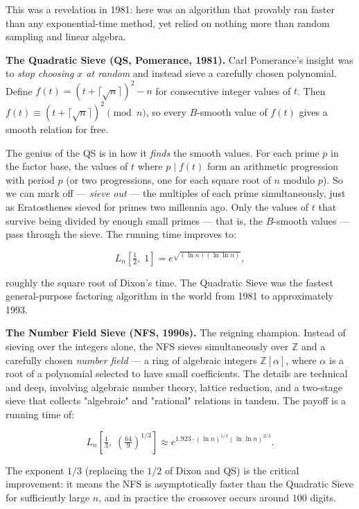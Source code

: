 \documentclass[11pt,twoside,openright]{book}
\theoremstyle{definition}
\theoremstyle{remark}
\begin{document}
This was a revelation in 1981: here was an algorithm that provably ran faster than any exponential-time method, yet relied on nothing more than random sampling and linear algebra.

\textbf{The Quadratic Sieve (QS, Pomerance, 1981).} Carl Pomerance's insight was to \textit{stop choosing $x$ at random} and instead sieve a carefully chosen polynomial. Define $f(t) = (t + \lceil \sqrt{n} \rceil)^2 - n$ for consecutive integer values of $t$. Then $f(t) \equiv (t + \lceil \sqrt{n} \rceil)^2 \pmod{n}$, so every $B$-smooth value of $f(t)$ gives a smooth relation for free.

The genius of the QS is in how it \textit{finds} the smooth values. For each prime $p$ in the factor base, the values of $t$ where $p \mid f(t)$ form an arithmetic progression with period $p$ (or two progressions, one for each square root of $n$ modulo $p$). So we can mark off --- \textit{sieve out} --- the multiples of each prime simultaneously, just as Eratosthenes sieved for primes two millennia ago. Only the values of $t$ that survive being divided by enough small primes --- that is, the $B$-smooth values --- pass through the sieve. The running time improves to:

\[L_n\!\left[\tfrac{1}{2}, \; 1\right] = e^{\sqrt{(\ln n)(\ln \ln n)}},\]

roughly the square root of Dixon's time. The Quadratic Sieve was the fastest general-purpose factoring algorithm in the world from 1981 to approximately 1993.

\textbf{The Number Field Sieve (NFS, 1990s).} The reigning champion. Instead of sieving over the integers alone, the NFS sieves simultaneously over $\mathbb{Z}$ and a carefully chosen \textit{number field} --- a ring of algebraic integers $\mathbb{Z}[\alpha]$, where $\alpha$ is a root of a polynomial selected to have small coefficients. The details are technical and deep, involving algebraic number theory, lattice reduction, and a two-stage sieve that collects "algebraic" and "rational" relations in tandem. The payoff is a running time of:

\[L_n\!\left[\tfrac{1}{3}, \; \left(\tfrac{64}{9}\right)^{\!1/3}\right] \approx e^{1.923 \cdot (\ln n)^{1/3} (\ln \ln n)^{2/3}}.\]

The exponent $1/3$ (replacing the $1/2$ of Dixon and QS) is the critical improvement: it means the NFS is asymptotically faster than the Quadratic Sieve for sufficiently large $n$, and in practice the crossover occurs around $100$ digits.
\end{document}
